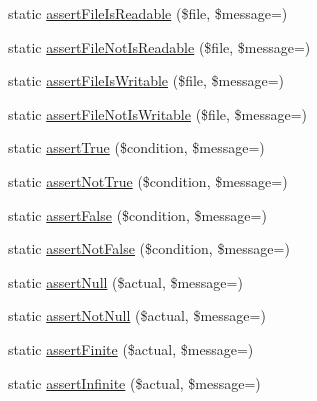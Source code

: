 \begin{DoxyCompactItemize}
\item 
static \mbox{\hyperlink{class_p_h_p_unit___framework___assert_adb4e5a3b9cd847b622cbed2ec6025b1e}{assert\+File\+Is\+Readable}} (\$file, \$message=\textquotesingle{}\textquotesingle{})
\item 
static \mbox{\hyperlink{class_p_h_p_unit___framework___assert_ac5ac88165939e8cd25777ac2f28a2d4e}{assert\+File\+Not\+Is\+Readable}} (\$file, \$message=\textquotesingle{}\textquotesingle{})
\item 
static \mbox{\hyperlink{class_p_h_p_unit___framework___assert_a9bb1c920fe9d06ab2dd7ddc00c2218b0}{assert\+File\+Is\+Writable}} (\$file, \$message=\textquotesingle{}\textquotesingle{})
\item 
static \mbox{\hyperlink{class_p_h_p_unit___framework___assert_afc58aa2cd0aeb9afe86fd6ec9c40362b}{assert\+File\+Not\+Is\+Writable}} (\$file, \$message=\textquotesingle{}\textquotesingle{})
\item 
static \mbox{\hyperlink{class_p_h_p_unit___framework___assert_ae3a6bba326884775958c38a469daaad0}{assert\+True}} (\$condition, \$message=\textquotesingle{}\textquotesingle{})
\item 
static \mbox{\hyperlink{class_p_h_p_unit___framework___assert_a3090aec96d242cb92cc5c6185ad7105b}{assert\+Not\+True}} (\$condition, \$message=\textquotesingle{}\textquotesingle{})
\item 
static \mbox{\hyperlink{class_p_h_p_unit___framework___assert_a0888008cd5d7a30018dbc72f6294d542}{assert\+False}} (\$condition, \$message=\textquotesingle{}\textquotesingle{})
\item 
static \mbox{\hyperlink{class_p_h_p_unit___framework___assert_afe42d405434685e69fa726d9cf874047}{assert\+Not\+False}} (\$condition, \$message=\textquotesingle{}\textquotesingle{})
\item 
static \mbox{\hyperlink{class_p_h_p_unit___framework___assert_a88450543c547ac347855c429e95f659d}{assert\+Null}} (\$actual, \$message=\textquotesingle{}\textquotesingle{})
\item 
static \mbox{\hyperlink{class_p_h_p_unit___framework___assert_a1f667796a3cc73d3e3e97c626b55bafb}{assert\+Not\+Null}} (\$actual, \$message=\textquotesingle{}\textquotesingle{})
\item 
static \mbox{\hyperlink{class_p_h_p_unit___framework___assert_a407e8c15f8574d58f23df64cd0d718ef}{assert\+Finite}} (\$actual, \$message=\textquotesingle{}\textquotesingle{})
\item 
static \mbox{\hyperlink{class_p_h_p_unit___framework___assert_a5b4025615e92d01d29dbd9e93255a5ed}{assert\+Infinite}} (\$actual, \$message=\textquotesingle{}\textquotesingle{})

\end{DoxyCompactItemize}
